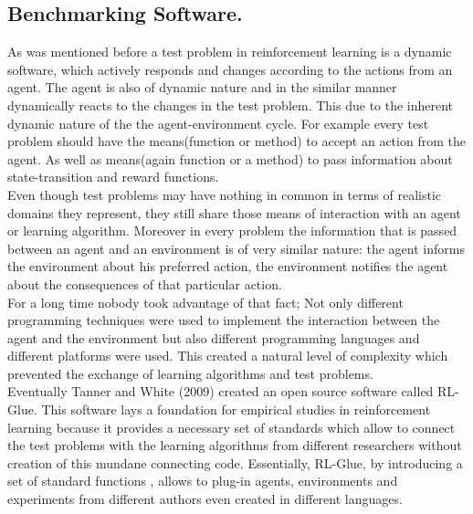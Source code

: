 {{\subsection{Benchmarking Software.}
As was mentioned before a test problem in reinforcement learning is a dynamic software, which actively responds and changes according to the actions from an agent. The agent is also of dynamic nature and in the similar manner dynamically reacts to the changes in the test problem. This due to the inherent dynamic nature of the the agent-environment cycle. For example every test problem should have the means(function or method) to accept an action from the agent. As well as means(again function or a method) to pass information about state-transition and reward functions. \\

Even though test problems may have nothing in common in terms of realistic domains they represent, they still share those means of interaction with an agent or learning algorithm. Moreover in every problem the information that is passed between an agent and an environment is of very similar nature: the agent informs the environment about his preferred action, the environment notifies the agent about the consequences of that particular action. \\

For a long time nobody took advantage of that fact; Not only different programming techniques were used to implement the interaction between the agent and the environment but also different programming languages and different platforms were used. This created a natural level of complexity which prevented the exchange of learning algorithms and test problems. \\

Eventually Tanner and White (2009)\cite{tanner2009rl} created an open source software called RL-Glue. This software lays a foundation for empirical studies in reinforcement learning because it provides a necessary set of standards which allow to connect the test problems with the learning algorithms from different researchers without creation of this mundane connecting code. Essentially, RL-Glue, by introducing a set of standard functions , allows to plug-in agents, environments and experiments from different authors even created in different languages. \\

}}
